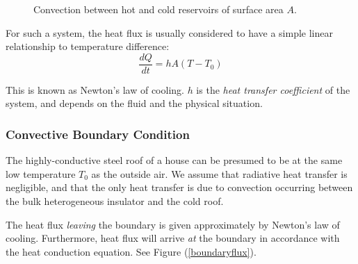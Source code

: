 \documentclass[12pt, a4paper, twoside, openright]{book}
\begin{document}
\begin{figure}[ht]
\centering
{}
\caption{Convection between hot and cold reservoirs of surface area $A$.}\label{convection}
\end{figure}

For such a system, the heat flux is usually considered to have a simple linear relationship to temperature difference:
\begin{equation}
\frac{dQ}{dt} = h A (T - T_0)
\end{equation}

This is known as Newton's law of cooling. $h$ is the \emph{heat transfer coefficient} of the system, and depends on the fluid and the physical situation.

\clearpage
\subsubsection{Convective Boundary Condition}

The highly-conductive steel roof of a house can be presumed to be at the same low temperature $T_0$ as the outside air. We assume that radiative heat transfer is negligible, and that the only heat transfer is due to convection occurring between the bulk heterogeneous insulator and the cold roof. 

The heat flux \emph{leaving} the boundary is given approximately by Newton's law of cooling.
Furthermore, heat flux will arrive \emph{at} the boundary in accordance with the heat conduction equation.  See Figure (\ref{boundaryflux}).
\end{document}
